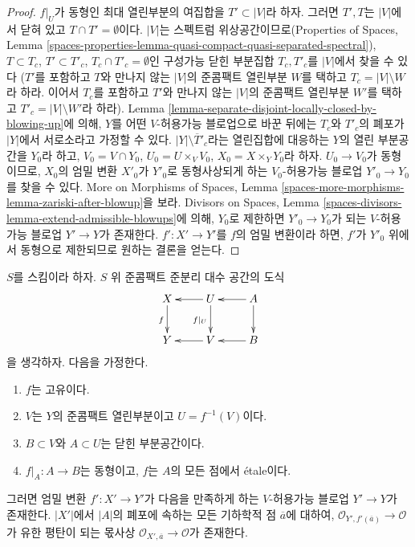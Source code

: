 \begin{proof}
$f|_U$가 동형인 최대 열린부분의 여집합을 $T' \subset |V|$라 하자.
그러면 $T', T$는 $|V|$에서 닫혀 있고 $T \cap T' = \emptyset$이다.
$|V|$는 스펙트럼 위상공간이므로(Properties of Spaces, Lemma
\ref{spaces-properties-lemma-quasi-compact-quasi-separated-spectral}),
$T \subset T_c$, $T' \subset T'_c$, $T_c \cap T'_c = \emptyset$인
구성가능 닫힌 부분집합 $T_c, T'_c$를 $|V|$에서 찾을 수 있다
($T'$를 포함하고 $T$와 만나지 않는 $|V|$의 준콤팩트 열린부분
$W$를 택하고 $T_c = |V| \setminus W$라 하라. 이어서 $T_c$를
포함하고 $T'$와 만나지 않는 $|V|$의 준콤팩트 열린부분 $W'$를
택하고 $T'_c = |V| \setminus W'$라 하라).
Lemma \ref{lemma-separate-disjoint-locally-closed-by-blowing-up}에 의해,
$Y$를 어떤 $V$-허용가능 블로업으로 바꾼 뒤에는 $T_c$와 $T'_c$의
폐포가 $|Y|$에서 서로소라고 가정할 수 있다.
$|Y| \setminus \overline{T}'_c$라는 열린집합에 대응하는 $Y$의
열린 부분공간을 $Y_0$라 하고, $V_0 = V \cap Y_0$,
$U_0 = U \times_V V_0$, $X_0 = X \times_Y Y_0$라 하자.
$U_0 \to V_0$가 동형이므로, $X_0$의 엄밀 변환 $X'_0$가
$Y'_0$로 동형사상되게 하는 $V_0$-허용가능 블로업
$Y'_0 \to Y_0$를 찾을 수 있다. More on Morphisms of Spaces, Lemma
\ref{spaces-more-morphisms-lemma-zariski-after-blowup}을 보라.
Divisors on Spaces, Lemma
\ref{spaces-divisors-lemma-extend-admissible-blowups}에 의해,
$Y_0$로 제한하면 $Y'_0 \to Y_0$가 되는 $V$-허용가능 블로업
$Y' \to Y$가 존재한다. $f' : X' \to Y'$를 $f$의 엄밀 변환이라
하면, $f'$가 $Y'_0$ 위에서 동형으로 제한되므로 원하는 결론을 얻는다.
\end{proof}

\begin{lemma}
\label{lemma-blowup-etale-along}
$S$를 스킴이라 하자. $S$ 위 준콤팩트 준분리 대수 공간의 도식
$$
\xymatrix{
X \ar[d]_f & U \ar[l] \ar[d]_{f|_U} & A \ar[d] \ar[l] \\
Y & V \ar[l] & B \ar[l]
}
$$
을 생각하자. 다음을 가정한다.
\begin{enumerate}
\item $f$는 고유이다.
\item $V$는 $Y$의 준콤팩트 열린부분이고 $U = f^{-1}(V)$이다.
\item $B \subset V$와 $A \subset U$는 닫힌 부분공간이다.
\item $f|_A : A \to B$는 동형이고, $f$는 $A$의 모든 점에서
\'etale이다.
\end{enumerate}
그러면 엄밀 변환 $f' : X' \to Y'$가 다음을 만족하게 하는
$V$-허용가능 블로업 $Y' \to Y$가 존재한다. $|X'|$에서 $|A|$의
폐포에 속하는 모든 기하학적 점 $\overline{a}$에 대하여,
$\mathcal{O}_{Y', f'(\overline{a})} \to \mathcal{O}$가 유한 평탄이
되는 몫사상 $\mathcal{O}_{X', \overline{a}} \to \mathcal{O}$가
존재한다.
\end{lemma}

